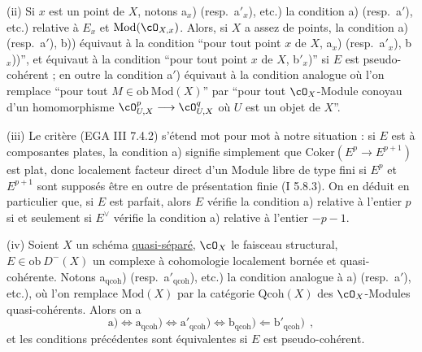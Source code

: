 \smallskip

(ii) Si $x$ est un point de $X$, notons a$_x$) (resp.\ a$'_x$), etc.) la condition a) (resp.\ a$'$), etc.) relative \`{a} $E_x$ et $\mathrm{Mod}(\cO_{X,x})$. Alors, si $X$ a assez de points, la condition a) (resp.\ a$'$), b)) \'{e}quivaut \`{a} la condition ``pour tout point $x$ de $X$, a$_x$) (resp.\ a$'_x$), b$_x$))'', et \'{e}quivaut \`{a} la condition ``pour tout point $x$ de $X$, b$'_x$)'' si $E$ est pseudo-coh\'{e}rent ; en outre la condition a$'$) \'{e}quivaut \`{a} la condition analogue o\`{u} l'on remplace ``pour tout $M \in \mathrm{ob}\ \mathrm{Mod}(X)$'' par ``pour tout $\cO_X$-Module conoyau d'un homomorphisme $\cO_{U,X}^p \longrightarrow \cO_{U,X}^q$ o\`{u} $U$ est un objet de $X$''.

\smallskip

(iii) Le crit\`{e}re (EGA III 7.4.2) s'\'{e}tend mot pour mot \`{a} notre situation : si $E$ est \`{a} composantes plates, la condition a) signifie simplement que $\mathrm{Coker}(E^p \longrightarrow E^{p+1})$ est plat, donc localement facteur direct d'un Module libre de type fini si $E^p$ et $E^{p+1}$ sont suppos\'{e}s \^{e}tre en outre de pr\'{e}sentation finie (I 5.8.3). On en d\'{e}duit en particulier que, si $E$ est parfait, alors $E$ v\'{e}rifie la condition a) relative \`{a} l'entier $p$ si et seulement si $E^\vee$ v\'{e}rifie la condition a) relative \`{a} l'entier $-p-1$.

\smallskip

(iv) Soient $X$ un sch\'{e}ma \underline{quasi-s\'{e}par\'{e}}, $\cO_X$ le faisceau structural, $E \in \mathrm{ob}\ D^-(X)$ un complexe \`{a} cohomologie localement born\'{e}e et quasi-coh\'{e}rente. Notons a$_{\mathrm{qcoh}}$) (resp.\ a$'_{\mathrm{qcoh}}$), etc.) la condition analogue \`{a} a) (resp.\ a$'$), etc.), o\`{u} l'on remplace $\mathrm{Mod}(X)$ par la cat\'{e}gorie $\mathrm{Qcoh}(X)$ des $\cO_X$-Modules quasi-coh\'{e}rents. Alors on a
\[
\mathrm{a)} \Longleftrightarrow \mathrm{a}_{\mathrm{qcoh}}) \Longleftrightarrow \mathrm{a'_{\mathrm{qcoh}}}) \Longleftrightarrow \mathrm{b_{\mathrm{qcoh}}}) \Longleftarrow \mathrm{b'_{\mathrm{qcoh}}})\ \ ,
\]
et les conditions pr\'{e}c\'{e}dentes sont \'{e}quivalentes si $E$ est pseudo-coh\'{e}rent.

